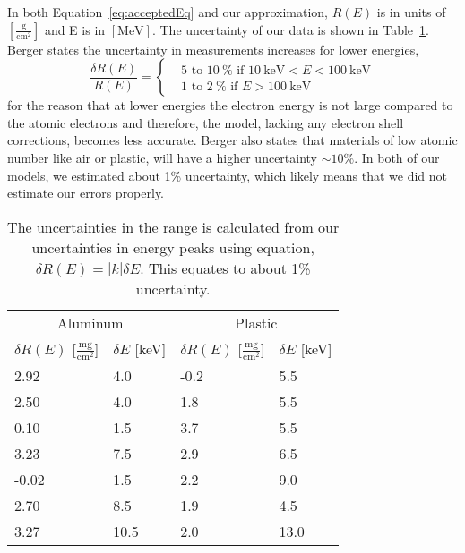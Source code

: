 In both Equation~\eqref{eq:acceptedEq} and our approximation, $R(E)$ is in units of $[\frac{\text{g}}{\text{cm}^2}]$ and E is in $[\text{MeV}]$. The uncertainty of our data is shown in Table~\ref{tab:uncertaintyConversion}. Berger states the uncertainty in measurements increases for lower energies, 
\begin{equation}
	\frac{\delta R(E)}{R(E)} = 
	\begin{cases}
		& 5 \text{~to~} 10~\% \text{ if } 10~\text{keV}<E<100~\text{keV} \\
		& 1 \text{~to~} 2~\% \text{ if } E>100~\text{keV} 
	\end{cases}
\end{equation}
for the reason that at lower energies the electron energy is not large compared to the atomic electrons and therefore, the model, lacking any electron shell corrections, becomes less accurate. Berger also states that materials of low atomic number like air or plastic, will have a higher uncertainty $\sim 10\%$. In both of our models, we estimated about 1\% uncertainty, which likely means that we did not estimate our errors properly.
\begin{table}
	\begin{center}
		\begin{tabular}
			{llll} \toprule \multicolumn{2}{c}{Aluminum} & \multicolumn{2}{c}{Plastic}\\
			\cmidrule(r){1-2} 
			\cmidrule(r){3-4} 
			$\delta R(E)$ [$\frac{\text{mg}}{\text{cm}^2}$] & $\delta E$ [keV] & $\delta R(E)$ [$\frac{\text{mg}}{\text{cm}^2}$] & $\delta E$ [keV]\\
			\midrule 
			2.92 	& 4.0	&-0.2	& 5.5				\\
			2.50 	& 4.0	& 1.8 	& 5.5				\\
			0.10 	& 1.5 	& 3.7 	& 5.5				\\
			3.23 	& 7.5 	& 2.9 	& 6.5				\\
		   -0.02 	& 1.5 	& 2.2	& 9.0				\\
			2.70 	& 8.5 	& 1.9 	& 4.5				\\
			3.27 	& 10.5 	& 2.0	& 13.0				\\
			\bottomrule 
		\end{tabular}
	\end{center}
	\caption{The uncertainties in the range is calculated from our uncertainties in energy peaks using equation,\cite{093570275X} $\delta R(E) = |k| \delta E$. This equates to about 1\% uncertainty.} \label{tab:uncertaintyConversion} 
\end{table}

